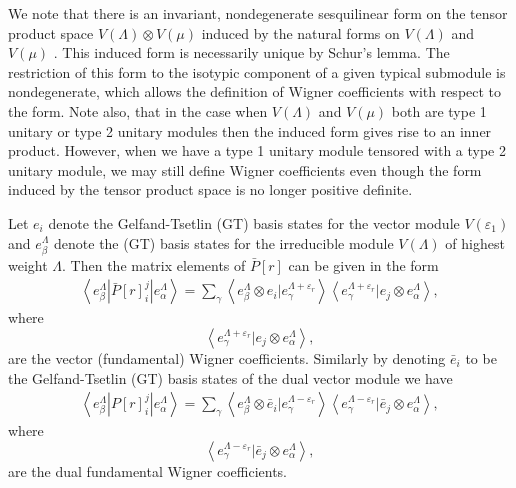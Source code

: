\documentclass[12pt]{article}
\begin{document}
We note that there is an invariant,
nondegenerate sesquilinear form on the tensor product space $V(\Lambda) \otimes V(\mu)$ induced by the natural forms on $ V(\Lambda)$ and $V(\mu)$ \cite{GIW1}. This induced form is necessarily unique by Schur's lemma. The restriction of this form to the isotypic component of a given typical submodule is nondegenerate, which allows the definition of Wigner coefficients with respect to the form. Note also, that in the case when $V(\Lambda)$ and $V(\mu)$ both are type 1 unitary or type 2 unitary modules then the induced form gives rise to an inner product. However, when we have a type 1 unitary module tensored with a type 2 unitary module, we may still define Wigner coefficients even though the form induced by the tensor product space is no longer positive definite.

Let $e_i$ denote the Gelfand-Tsetlin (GT) basis states for the vector module $V(\varepsilon_1)$ and ${e^\Lambda_\beta}$ denote the (GT) basis states for the irreducible module $V(\Lambda)$ of highest weight $\Lambda$. Then the matrix elements of $\bar{P}[r]$ can be given in the form
\begin{align}
\left\langle e^\Lambda_\beta | \bar{P}[r]^j_i | e^{\Lambda}_\alpha \right\rangle =
\sum_\gamma \left\langle e^\Lambda_\beta \otimes e_i | e^{\Lambda + \varepsilon_r}_\gamma \right\rangle
\left\langle e^{\Lambda+\varepsilon_r}_\gamma | e_j \otimes e^\Lambda_\alpha \right\rangle, \label{BarPij}
\end{align}
where
$$
\left\langle e^{\Lambda+\varepsilon_r}_\gamma | e_j \otimes e^\Lambda_\alpha \right\rangle,
$$
are the vector (fundamental) Wigner coefficients.
Similarly by denoting $\bar{e}_i$ to be the Gelfand-Tsetlin (GT) basis states of the dual vector module we have 
\begin{align}
\left\langle e^\Lambda_\beta | P[r]^j_i | e^{\Lambda}_\alpha \right\rangle =
\sum_\gamma \left\langle e^\Lambda_\beta \otimes \bar{e}_i | e^{\Lambda - \varepsilon_r}_\gamma \right\rangle
\left\langle e^{\Lambda-\varepsilon_r}_\gamma | \bar{e}_j \otimes e^\Lambda_\alpha \right\rangle, \label{Pij}
\end{align}
where
$$
\left\langle e^{\Lambda-\varepsilon_r}_\gamma | \bar{e}_j \otimes e^\Lambda_\alpha \right\rangle,
$$
are the dual fundamental Wigner coefficients.
\end{document}
